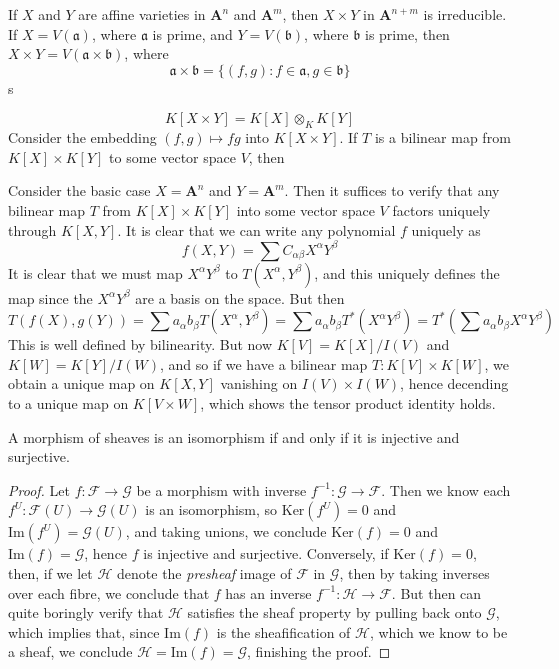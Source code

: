 If $X$ and $Y$ are affine varieties in $\mathbf{A}^n$ and $\mathbf{A}^m$, then $X \times Y$ in $\mathbf{A}^{n+m}$ is irreducible. If $X = V(\mathfrak{a})$, where $\mathfrak{a}$ is prime, and $Y = V(\mathfrak{b})$, where $\mathfrak{b}$ is prime, then $X \times Y = V(\mathfrak{a} \times \mathfrak{b})$, where
%
\[ \mathfrak{a} \times \mathfrak{b} = \{ (f,g) : f \in \mathfrak{a}, g \in \mathfrak{b} \} \]
%
s

\[ K[X \times Y] = K[X] \otimes_K K[Y] \]
%
Consider the embedding $(f,g) \mapsto fg$ into $K[X \times Y]$. If $T$ is a bilinear map from $K[X] \times K[Y]$ to some vector space $V$, then 

Consider the basic case $X = \mathbf{A}^n$ and $Y = \mathbf{A}^m$. Then it suffices to verify that any bilinear map $T$ from $K[X] \times K[Y]$ into some vector space $V$ factors uniquely through $K[X, Y]$. It is clear that we can write any polynomial $f$ uniquely as
%
\[ f(X,Y) = \sum C_{\alpha \beta} X^\alpha Y^\beta \]
%
It is clear that we must map $X^\alpha Y^\beta$ to $T(X^\alpha, Y^\beta)$, and this uniquely defines the map since the $X^\alpha Y^\beta$ are a basis on the space. But then
%
\[ T(f(X), g(Y)) = \sum a_\alpha b_\beta T(X^\alpha, Y^\beta) = \sum a_\alpha b_\beta T^*(X^\alpha Y^\beta) = T^* \left(\sum a_\alpha b_\beta X^\alpha Y^\beta \right) \]
%
This is well defined by bilinearity. But now $K[V] = K[X]/I(V)$ and $K[W] = K[Y]/I(W)$, and so if we have a bilinear map $T: K[V] \times K[W]$, we obtain a unique map on $K[X,Y]$ vanishing on $I(V) \times I(W)$, hence decending to a unique map on $K[V \times W]$, which shows the tensor product identity holds.

\begin{theorem}
    A morphism of sheaves is an isomorphism if and only if it is injective and surjective.
\end{theorem}
\begin{proof}
    Let $f: \mathcal{F} \to \mathcal{G}$ be a morphism with inverse $f^{-1}: \mathcal{G} \to \mathcal{F}$. Then we know each $f^U: \mathcal{F}(U) \to \mathcal{G}(U)$ is an isomorphism, so $\text{Ker}(f^U) = 0$ and $\text{Im}(f^U) = \mathcal{G}(U)$, and taking unions, we conclude $\text{Ker}(f) = 0$ and $\text{Im}(f) = \mathcal{G}$, hence $f$ is injective and surjective. Conversely, if $\text{Ker}(f) = 0$, then, if we let $\mathcal{H}$ denote the {\it presheaf} image of $\mathcal{F}$ in $\mathcal{G}$, then by taking inverses over each fibre, we conclude that $f$ has an inverse $f^{-1}: \mathcal{H} \to \mathcal{F}$. But then can quite boringly verify that $\mathcal{H}$ satisfies the sheaf property by pulling back onto $\mathcal{G}$, which implies that, since $\text{Im}(f)$ is the sheafification of $\mathcal{H}$, which we know to be a sheaf, we conclude $\mathcal{H} = \text{Im}(f) = \mathcal{G}$, finishing the proof.
\end{proof}

